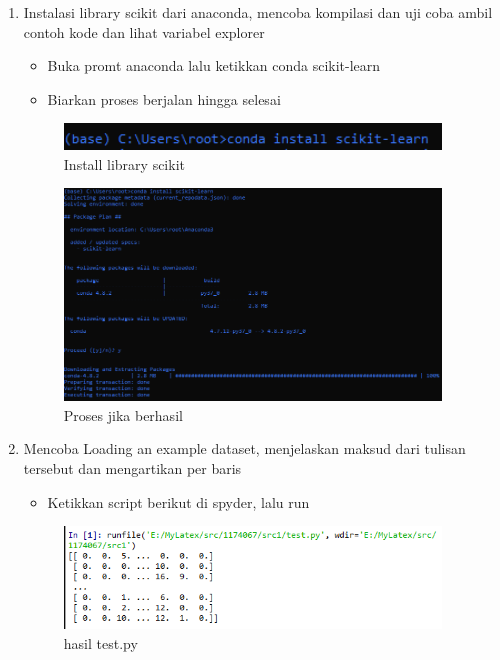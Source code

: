 	\begin{enumerate}
		\item Instalasi library scikit dari anaconda, mencoba kompilasi dan uji coba ambil contoh kode dan lihat variabel explorer

			\begin{itemize}
				\item Buka promt anaconda lalu ketikkan conda scikit-learn
				\item Biarkan proses berjalan hingga selesai
			\end{itemize}
		
			\begin{figure}[H]
				\begin{center}
				 \includegraphics[width=10cm]{figures/1174067/1/1.png}
				 \caption{Install library scikit}	
				\end{center}
			\end{figure}
			
			\begin{figure}[H]
				\begin{center}
				 \includegraphics[width=10cm]{figures/1174067/1/2.png}
				 \caption{Proses jika berhasil}	
				\end{center}
			\end{figure}
	
		\item Mencoba Loading an example dataset, menjelaskan maksud dari tulisan tersebut dan mengartikan per baris

			\begin{itemize}
				\item Ketikkan script berikut di spyder, lalu run
					
			\end{itemize}

			\begin{figure}[H]
				\begin{center}
				 \includegraphics[width=10cm]{figures/1174067/1/3.png}
				 \caption{hasil test.py}	
				\end{center}
			\end{figure}


\end{enumerate}
